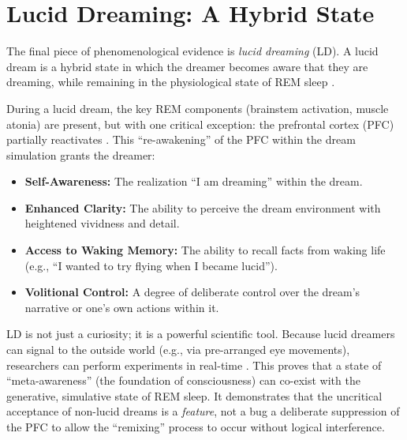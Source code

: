 \section{Lucid Dreaming: A Hybrid State}\label{sec:lucid}

The final piece of phenomenological evidence is \textit{lucid dreaming} (LD). A lucid dream is a hybrid state in which the dreamer becomes aware that they are dreaming, while remaining in the physiological state of REM sleep \citep{voss2009lucid}.

During a lucid dream, the key REM components (brainstem activation, muscle atonia) are present, but with one critical exception: the prefrontal cortex (PFC) partially reactivates \citep{voss2009lucid}. This ``re-awakening'' of the PFC within the dream simulation grants the dreamer:

\begin{itemize}
    \item \textbf{Self-Awareness:} The realization ``I am dreaming'' within the dream.
    \item \textbf{Enhanced Clarity:} The ability to perceive the dream environment with heightened vividness and detail.  
    \item \textbf{Access to Waking Memory:} The ability to recall facts from waking life (e.g., ``I wanted to try flying when I became lucid'').
    \item \textbf{Volitional Control:} A degree of deliberate control over the dream's narrative or one's own actions within it.
\end{itemize}

LD is not just a curiosity; it is a powerful scientific tool. Because lucid dreamers can signal to the outside world (e.g., via pre-arranged eye movements), researchers can perform experiments in real-time \citep{baird2019}. This proves that a state of ``meta-awareness'' (the foundation of consciousness) can co-exist with the generative, simulative state of REM sleep. It demonstrates that the uncritical acceptance of non-lucid dreams is a \textit{feature}, not a bug \- a deliberate suppression of the PFC to allow the ``remixing'' process to occur without logical interference.

